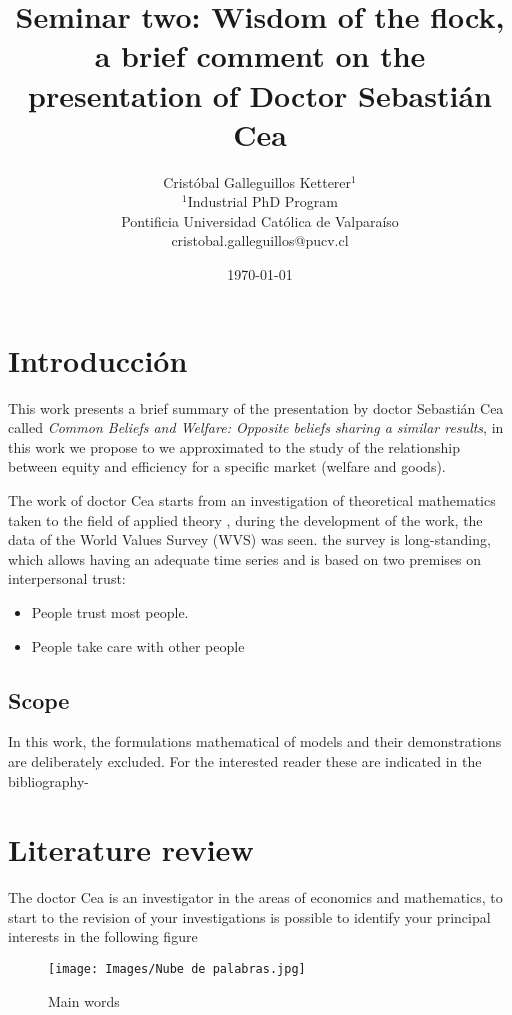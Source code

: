 \documentclass{article}
\title{Seminar two: Wisdom of the flock, a brief comment on the presentation of Doctor Sebastián Cea}
\author{Cristóbal Galleguillos Ketterer$^{1}$\\
\small{$^{1}$Industrial PhD Program}\\
\small{Pontificia Universidad Católica de Valparaíso}\\
\small{cristobal.galleguillos@pucv.cl}
}
\date{\small{\today}}
\begin{document}
\maketitle

\section{Introducción}

This work presents a brief summary of the presentation by doctor Sebastián Cea called \textit {Common Beliefs and Welfare: Opposite beliefs sharing a similar results}\cite{art1:articulo1}, in this work we propose to we approximated to the study of the relationship between equity and efficiency for a specific market (welfare and goods).

The work of doctor Cea starts from an investigation of theoretical mathematics taken to the field of applied theory \cite{art2:articulo}\cite{art3:articulo}\cite{art4:articulo}, during the development of the work, the data of the World Values Survey (WVS) was seen. the survey is long-standing, which allows having an adequate time series and is based on two premises on interpersonal trust:

\begin{itemize}
   \item People trust most people.
   \item People take care with other people
\end{itemize}

\subsection{Scope}

In this work, the formulations mathematical of models and their demonstrations are deliberately excluded. For the interested reader these are indicated in the bibliography-

\section{Literature review}

The doctor Cea is an investigator in the areas of economics and mathematics, to start to the revision of your investigations is possible to identify your principal interests in the following figure

\begin{figure}[H]
\texttt{[image: Images/Nube de palabras.jpg]}
\centering
\caption{Main words}
\label{etiqueta}
\end{figure}
\end{document}
